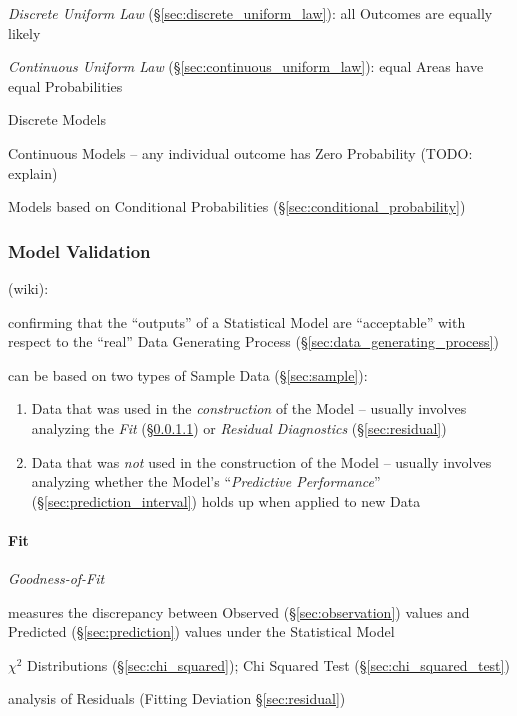 \emph{Discrete Uniform Law} (\S\ref{sec:discrete_uniform_law}): all Outcomes are
equally likely

\emph{Continuous Uniform Law} (\S\ref{sec:continuous_uniform_law}): equal Areas
have equal Probabilities

Discrete Models

Continuous Models -- any individual outcome has Zero Probability (TODO: explain)

Models based on Conditional Probabilities (\S\ref{sec:conditional_probability})



\subsubsection{Model Validation}\label{sec:model_validation}

(wiki):

confirming that the ``outputs'' of a Statistical Model are ``acceptable'' with
respect to the ``real'' Data Generating Process
(\S\ref{sec:data_generating_process})

can be based on two types of Sample Data (\S\ref{sec:sample}):
\begin{enumerate}
  \item Data that was used in the \emph{construction} of the Model -- usually
    involves analyzing the \emph{Fit} (\S\ref{sec:model_fit}) or \emph{Residual
      Diagnostics} (\S\ref{sec:residual})
  \item Data that was \emph{not} used in the construction of the Model --
    usually involves analyzing whether the Model's ``\emph{Predictive
      Performance}'' (\S\ref{sec:prediction_interval}) holds up when applied to
    new Data
\end{enumerate}



\paragraph{Fit}\label{sec:model_fit}\hfill

\emph{Goodness-of-Fit}

measures the discrepancy between Observed (\S\ref{sec:observation}) values and
Predicted (\S\ref{sec:prediction}) values under the Statistical Model

$\chi^2$ Distributions (\S\ref{sec:chi_squared});
Chi Squared Test (\S\ref{sec:chi_squared_test})

\fist analysis of Residuals (Fitting Deviation \S\ref{sec:residual})

